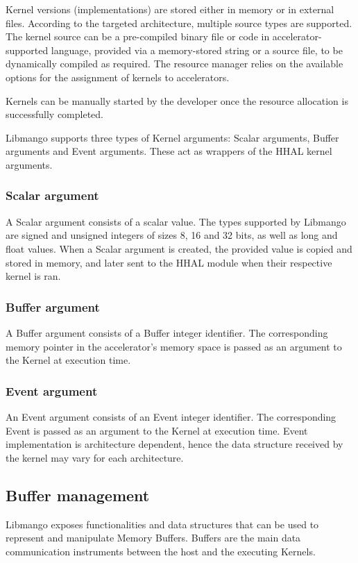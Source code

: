Kernel versions (implementations) are stored either in memory or in external files. According to the targeted architecture, multiple source types are supported. The kernel source can be a pre-compiled binary file or code in accelerator-supported language, provided via a memory-stored string or a source file, to be dynamically compiled as required.
The resource manager relies on the available options for the assignment of kernels to accelerators.

Kernels can be manually started by the developer once the resource allocation is successfully completed.

Libmango supports three types of Kernel arguments: Scalar arguments, Buffer arguments and Event arguments.
These act as wrappers of the HHAL kernel arguments.

\subsubsection{Scalar argument}
A Scalar argument consists of a scalar value. The types supported by Libmango are signed and unsigned integers of sizes 8, 16 and 32 bits, as well as long and float values. 
When a Scalar argument is created, the provided value is copied and stored in memory, and later sent to the HHAL module when their respective kernel is ran. 

\subsubsection{Buffer argument}
A Buffer argument consists of a Buffer integer identifier. The corresponding memory pointer in the accelerator's memory space is passed as an argument to the Kernel at execution time.

\subsubsection{Event argument}
An Event argument consists of an Event integer identifier. The corresponding Event is passed as an argument to the Kernel at execution time.
Event implementation is architecture dependent, hence the data structure received by the kernel may vary for each architecture.

\subsection{Buffer management}
Libmango exposes functionalities and data structures that can be used to represent and manipulate Memory Buffers. Buffers are the main data communication instruments between the host and the executing Kernels. 

